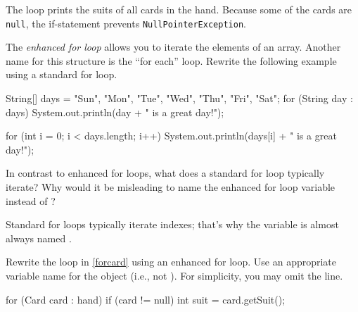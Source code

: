 \begin{answer}
The loop prints the suits of all cards in the hand.
Because some of the cards are {\tt null}, the if-statement prevents {\tt NullPointerException}.
\end{answer}


\Q The \textit{enhanced for loop} allows you to iterate the elements of an array.
Another name for this structure is the ``for each'' loop.
Rewrite the following example using a standard for loop.

\vspace{1ex}
\begin{javalst}
String[] days = {"Sun", "Mon", "Tue", "Wed", "Thu", "Fri", "Sat"};
for (String day : days) {
    System.out.println(day + " is a great day!");
}
\end{javalst}
\vspace{-1em}

\begin{answer}[5em]
\begin{javaans}
for (int i = 0; i < days.length; i++) {
    System.out.println(days[i] + " is a great day!");
}
\end{javaans}
\end{answer}


\Q In contrast to enhanced for loops, what does a standard for loop typically iterate?
Why would it be misleading to name the enhanced for loop variable  instead of ?

\begin{answer}[3em]
Standard for loops typically iterate indexes; that's why the variable is almost always named .
\end{answer}


\Q \label{foreach}
Rewrite the loop in \ref{forcard} using an enhanced for loop.
Use an appropriate variable name for the  object (i.e., not ).
For simplicity, you may omit the  line.

\vspace{-1ex}
\begin{answer}[7em]
\begin{javaans}
for (Card card : hand) {
    if (card != null) {
        int suit = card.getSuit();
    }
}
\end{javaans}
\end{answer}
